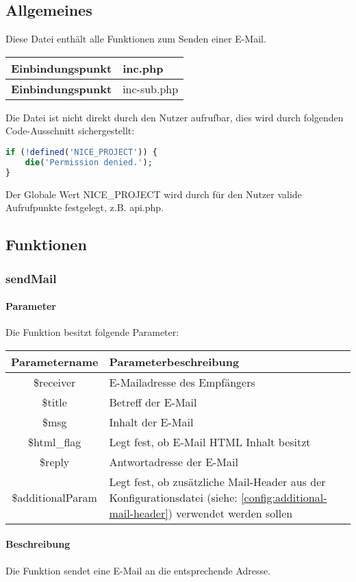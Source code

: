 \subsection{Allgemeines} Diese Datei enthält alle Funktionen zum Senden einer E-Mail.
\begin{table}[H]
	\begin{tabular}{|c|p{11cm}|}
		\hline
		\textbf{Einbindungspunkt} & inc.php \\ \hline
		\textbf{Einbindungspunkt} & inc-sub.php \\ \hline
	\end{tabular}
\end{table}
Die Datei ist nicht direkt durch den Nutzer aufrufbar, dies wird durch folgenden Code-Ausschnitt sichergestellt:
\begin{lstlisting}[language=php]
if (!defined('NICE_PROJECT')) {
	die('Permission denied.');
}
\end{lstlisting}
Der Globale Wert {\glqq NICE\_PROJECT\grqq} wird durch für den Nutzer valide Aufrufpunkte festgelegt, z.B. {\glqq api.php\grqq}.
\subsection{Funktionen}
\subsubsection{sendMail}
\paragraph{Parameter} Die Funktion besitzt folgende Parameter:
\begin{table}[H]
	\begin{tabular}{|c|p{11cm}|}
		\hline
		\textbf{Parametername} & \textbf{Parameterbeschreibung} \\ \hline
		\$receiver        & E-Mailadresse des Empfängers \\ \hline
		\$title           & Betreff der E-Mail \\ \hline
		\$msg             & Inhalt der E-Mail \\ \hline
		\$html\_flag      & Legt fest, ob E-Mail HTML Inhalt besitzt \\ \hline
		\$reply           & Antwortadresse der E-Mail \\ \hline
		\$additionalParam & Legt fest, ob zusätzliche Mail-Header aus der Konfigurationsdatei (siehe: \autoref{config:additional-mail-header}) verwendet werden sollen \\ \hline
	\end{tabular}
\end{table}
\paragraph{Beschreibung} Die Funktion sendet eine E-Mail an die entsprechende Adresse.
